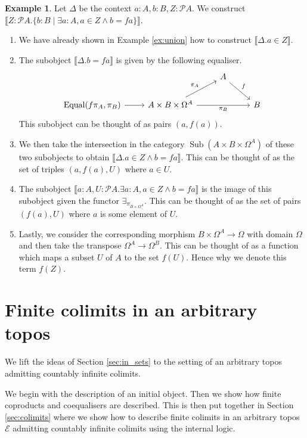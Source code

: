\documentclass{birkjour}
\theoremstyle{plain}
\theoremstyle{definition}
\newtheorem{example}[thm]{Example}
\newcommand{\call}[1]{\mathcal{#1}}
\newcommand{\lto}{\longrightarrow}
\begin{document}
	\begin{example}
		Let $\Delta$ be the context $a:A, b:B, Z:\call{P}A$. We construct $ \llbracket Z:\call{P}A . \lbrace b:B \mid \exists a:A, a \in Z \wedge b = fa \rbrace\rrbracket$.
		\begin{enumerate}
			\item We have already shown in Example \ref{ex:union} how to construct $\llbracket \Delta. a \in Z\rrbracket$.
			\item The subobject $\llbracket \Delta. b = fa\rrbracket$ is given by the following equaliser.
			\begin{equation}
				\begin{tikzcd}
					& & A\arrow[dr,"{f}"]\\
					\operatorname{Equal}(f\pi_A, \pi_B)\arrow[r] & A \times B \times \Omega^A\arrow[ur,"{\pi_A}"]\arrow[rr,swap,"{\pi_B}"] & & B
				\end{tikzcd}
			\end{equation}
			This subobject can be thought of as pairs $(a,f(a))$.
			\item We then take the intersection in the category $\operatorname{Sub}(A \times B \times \Omega^A)$ of these two subobjects to obtain $\llbracket \Delta. a \in Z \wedge b = fa\rrbracket$. This can be thought of as the set of triples $(a,f(a),U)$ where $a \in U$.
			\item The subobject $\llbracket a:A, U: \call{P}A. \exists a:A, a \in Z \wedge b = fa\rrbracket$ is the image of this subobject given the functor $\exists_{\pi_{B \times \Omega^A}}$. This can be thought of as the set of pairs $(f(a),U)$ where $a$ is some element of $U$.
			\item Lastly, we consider the corresponding morphism $B \times \Omega^A \lto \Omega$ with domain $\Omega$ and then take the transpose $\Omega^A \lto \Omega^B$. This can be thought of as a function which maps a subset $U$ of $A$ to the set $f(U)$. Hence why we denote this term $f(Z)$.
		\end{enumerate}
	\end{example}
	
	\section{Finite colimits in an arbitrary topos}\label{sec:arbitrary_topos}
	We lift the ideas of Section \ref{sec:in_sets} to the setting of an arbitrary topos admitting countably infinite colimits.
	
	We begin with the description of an initial object. Then we show how finite coproducts and coequalisers are described. This is then put together in Section \ref{sec:colimits} where we show how to describe finite colimits in an arbitrary topos $\call{E}$ admitting countably infinite colimits using the internal logic.
	
\end{document}
